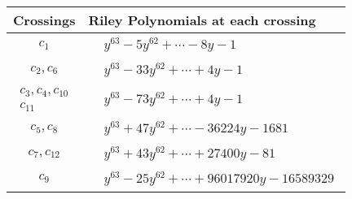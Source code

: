 \documentclass[1p]{elsarticle_modified}
\theoremstyle{definition}
\begin{document}
\begin{tabular}{m{50pt}|m{274pt}}
Crossings & \hspace{64pt}Riley Polynomials at each crossing \\
\hline $$\begin{aligned}c_{1}\end{aligned}$$&$\begin{aligned}
&y^{63}-5 y^{62}+\cdots-8 y-1
\end{aligned}$\\
\hline $$\begin{aligned}c_{2},c_{6}\end{aligned}$$&$\begin{aligned}
&y^{63}-33 y^{62}+\cdots+4 y-1
\end{aligned}$\\
\hline $$\begin{aligned}c_{3},c_{4},c_{10}\\c_{11}\end{aligned}$$&$\begin{aligned}
&y^{63}-73 y^{62}+\cdots+4 y-1
\end{aligned}$\\
\hline $$\begin{aligned}c_{5},c_{8}\end{aligned}$$&$\begin{aligned}
&y^{63}+47 y^{62}+\cdots-36224 y-1681
\end{aligned}$\\
\hline $$\begin{aligned}c_{7},c_{12}\end{aligned}$$&$\begin{aligned}
&y^{63}+43 y^{62}+\cdots+27400 y-81
\end{aligned}$\\
\hline $$\begin{aligned}c_{9}\end{aligned}$$&$\begin{aligned}
&y^{63}-25 y^{62}+\cdots+96017920 y-16589329
\end{aligned}$\\
\hline
\end{tabular}
\vskip 2pc
\end{document}
